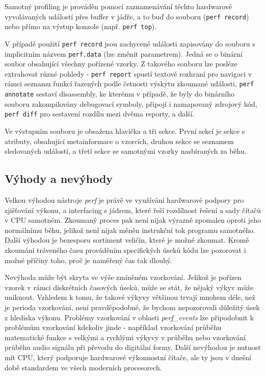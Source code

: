 \documentclass[czech,BP]{thesiskiv}
\begin{document}
Samotný profiling je prováděn pomocí zaznamenávání těchto hardwarově vyvolávaných událostí přes buffer v jádře, a to buď do souboru (\texttt{perf record}) nebo přímo na výstup konzole (např. \texttt{perf top}).

V případě použití \texttt{perf record} jsou zachycené události zapisovány do souboru s implicitním názvem \texttt{perf.data} (lze změnit parametrem). Jedná se o binární soubor obsahující všechny pořízené vzorky. Z takového souboru lze posléze extrahovat různé pohledy - \texttt{perf report} spustí textové rozhraní pro navigaci v rámci seznamu funkcí řazených podle četnosti výskytu zkoumané události, \texttt{perf annotate} sestaví disassembly, ke kterému v případě, že byly do binárního souboru zakompilovány debugovací symboly, připojí i namapovaný zdrojový kód, \texttt{perf diff} pro sestavení rozdílu mezi dvěma reporty, a další.

Ve výstupním souboru je obsažena hlavička a tři sekce. První sekcí je sekce s atributy, obsahující metainformace o vzorcích, druhou sekce se seznamem sledovaných událostí, a třetí sekce se samotnými vzorky nasbíraných za běhu\cite{perf2}.

\subsection*{Výhody a nevýhody}

Velkou výhodou nástroje \emph{perf} je právě ve využívání hardwarové podpory pro zjišťování výkonu, a interfacing s jádrem, které řeší rozdílnost řešení a sady čítačů v CPU samotném. Zkoumaný proces pak není nijak výrazně zpomalen oproti jeho normálnímu běhu, jelikož není nijak měněn instrukční tok programu samotného. Další výhodou je bezesporu sortiment veličin, které je možné zkoumat. Kromě  zkoumání tráveného času prováděním specifických úseků kódu lze pozorovat i možné příčiny toho, proč je naměřený čas tak dlouhý.

Nevýhoda může být skryta ve výše zmíněném vzorkování. Jelikož je pořízen vzorek v rámci diskrétních časových úseků, může se stát, že nějaký výkyv může uniknout. Vzhledem k tomu, že takové výkyvy většinou trvají mnohem déle, než je perioda vzorkování, není pravděpodobné, že bychom nepozorovali důležitý úsek z hlediska výkonu. Problémy vzorkování v oblasti \emph{perf\_events} lze připodobnit k problémům vzorkování kdekoliv jinde - například vzorkování průběhu matematické funkce s velkými a rychlými výkyvy v průběhu nebo vzorkování průběhu audio signálu při převodu do digitální formy. Další nevýhodou je nutnost mít CPU, který podporuje hardwarové výkonnostní čítače, ale ty jsou v dnešní době standardem ve všech moderních procesorech.
\end{document}
